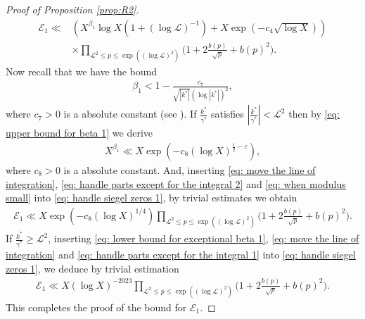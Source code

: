 \documentclass[12pt,reqno]{amsart}
\numberwithin{equation}{section}
\theoremstyle{plain}
\theoremstyle{definition}
\theoremstyle{remark}
\begin{document}
\begin{proof}[Proof of Proposition \ref{prop:R2}]
\begin{equation*}
  \begin{split}
\mathcal{E}_1 \ll &\left(X^{\beta_1}\log X \left(1+(\log \mathcal{L})^{-1} \right)  + X \exp(-c_4\sqrt{\log X})\right) \\
&\times \prod_{\mathcal{L}^2\leq p \leq \exp((\log \mathcal{L})^2)}\bigg(1+2\frac{b(p)}{\sqrt{p}}+b(p)^2\bigg).
  \end{split}
\end{equation*}
Now recall that we have the bound
\begin{align}\label{eq: upper bound for beta 1}
  \beta_1 < 1 - \frac{c_7}{\sqrt{|k^*|} (\log |k^*|)^2},
\end{align}
where $c_7 > 0$ is a absolute constant (see \cite[equation (12) of Chapter 14]{Da00}).
If $\frac{k^*}{\gamma^*}$ satisfies $|\frac{k^*}{\gamma^*}| <  \mathcal{L}^2  $ then by \eqref{eq:  upper bound for beta 1} we derive
\begin{align}\label{eq: when modulus small}
  X^{\beta_1} \ll X \exp(-c_8 (\log X)^{\frac{1}{2}-\varepsilon}),
  \end{align}
where $c_8>0$ is a absolute constant.
And, inserting \eqref{eq: move the line of integration}, \eqref{eq: handle parts except for the integral 2} and \eqref{eq: when modulus small} into \eqref{eq: handle siegel zeros 1}, by trivial estimates we obtain
\begin{align*}
  \mathcal{E}_1 \ll  X \exp(-c_8 (\log X)^{1/4})\prod_{\mathcal{L}^2\leq p \leq \exp((\log \mathcal{L})^2)}\bigg(1+2\frac{b(p)}{\sqrt{p}}+b(p)^2\bigg).
\end{align*}
If $\frac{k^*}{\gamma^*} \geq \mathcal{L}^2 $, inserting \eqref{eq:  lower bound for exceptional beta 1}, \eqref{eq: move the line of integration} and \eqref{eq: handle parts except for the integral 1} into \eqref{eq: handle siegel zeros 1}, we deduce by trivial estimation
\begin{align*}
  \mathcal{E}_1 \ll X(\log X)^{-2023}\prod_{\mathcal{L}^2\leq p \leq \exp((\log \mathcal{L})^2)}\bigg(1+2\frac{b(p)}{\sqrt{p}}+b(p)^2\bigg).
\end{align*}
This completes the proof of the bound for $\mathcal{E}_1$.




\end{proof}
\end{document}
